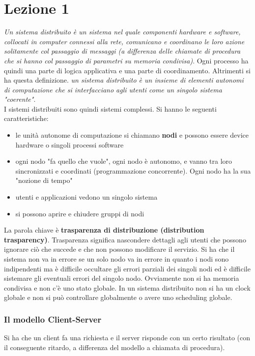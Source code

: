 \documentclass[a4paper,12pt, oneside]{book}
\begin{document}
\chapter{Lezione 1}
\textit{Un sistema distribuito è un sistema nel quale componenti hardware e software, collocati in computer connessi alla rete, comunicano e coordinano le loro azione solitamente col passaggio di messaggi (a differenza delle chiamate di procedura che si hanno col passaggio di parametri su memoria condivisa)}. Ogni processo ha quindi una parte di logica applicativa e una parte di coordinamento. Altrimenti si ha questa definizione. \textit{un sistema distribuito è un insieme di elementi autonomi di computazione che si interfacciano agli utenti come un singolo sistema "coerente"}.\\
I sistemi distribuiti sono quindi sistemi complessi. Si hanno le seguenti caratteristiche:
\begin{itemize}
\item le unità autonome di computazione si chiamano \textbf{nodi} e possono essere device hardware o singoli processi software
\item ogni nodo "fa quello che vuole", ogni nodo è autonomo, e vanno tra loro sincronizzati e coordinati (programmazione concorrente). Ogni nodo ha la sua "nozione di tempo"
\item utenti e applicazioni vedono un singolo sistema
\item si possono aprire e chiudere gruppi di nodi
\end{itemize}
La parola chiave è \textbf{trasparenza di distribuzione (distribution trasparency)}. Trasparenza significa nascondere dettagli agli utenti che possono ignorare ciò che succede e che non possono modificare il servizio. Si ha che il sistema non va in errore se un solo nodo va in errore in quanto i nodi sono indipendenti ma è difficile occultare gli errori parziali dei singoli nodi ed è difficile sistemare gli eventuali errori del singolo nodo. Ovviamente non si ha memoria condivisa e non c'è uno stato globale. In un sistema distribuito non si ha un clock globale e non si può controllare globalmente o avere uno scheduling globale.
\subsection{Il modello Client-Server}
Si ha che un client fa una richiesta e il server risponde con un certo risultato (con il conseguente ritardo, a differenza del modello a chiamata di procedura).  
\end{document}
